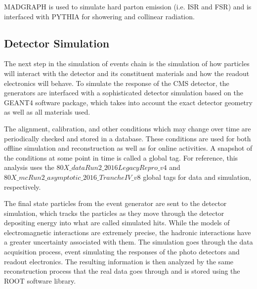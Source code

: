 MADGRAPH\cite{Alwall:1647049} is used to simulate hard parton emission (i.e. ISR and FSR) and is interfaced with PYTHIA for showering and collinear radiation.

\subsection{Detector Simulation}

The next step in the simulation of events chain is the simulation of how particles will interact with the detector and its constituent materials and how the readout electronics will behave. To simulate the response of the CMS detector, the generators are interfaced with a sophisticated detector simulation based on the GEANT4\cite{geant4sim} software package, which takes into account the exact detector geometry as well as all materials used.

The alignment, calibration, and other conditions which may change over time are periodically checked and stored in a database. These conditions are used for both offline simulation and reconstruction as well as for online activities. A snapshot of the conditions at some point in time is called a global tag. For reference, this analysis uses the $80X\_dataRun2\_2016LegacyRepro\_v4$ and $80X\_mcRun2\_asymptotic\_2016\_TrancheIV\_v8$ global tags for data and simulation, respectively. 

The final state particles from the event generator are sent to the detector simulation, which tracks the particles as they move through the detector depositing energy into what are called simulated hits. While the models of electromagnetic interactions are extremely precise, the hadronic interactions have a greater uncertainty associated with them. The simulation goes through the data acquisition process, event simulating the responses of the photo detectors and readout electronics. The resulting information is then analyzed by the same reconstruction process that the real data goes through and is stored using the ROOT software library. 

